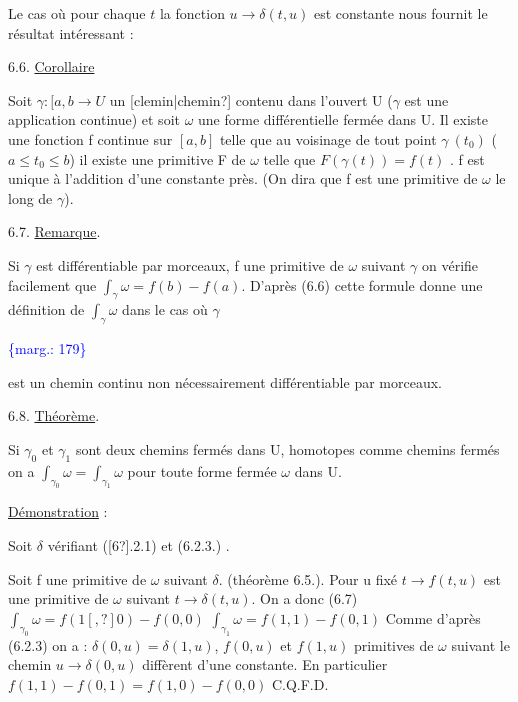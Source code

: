 \documentclass[11pt]{article}
\newcommand{\scanpage}[1]{\par\bigskip\noindent{\small\sffamily[scan #1]}\par}
\newcommand{\mspage}[1]{{\small\sffamily[p.\,#1]}}
\newcommand{\margin}[1]{\textcolor{blue}{\{\textsf{marg.:} #1\}}}
\newcommand{\uline}[1]{\underline{#1}}
\newcommand{\unsure}[1]{[#1?]}
\begin{document}
Le cas où pour chaque $t$ la fonction $u \to \delta(t,u)$ est constante nous
fournit le résultat intéressant :

6.6. \uline{Corollaire}

Soit $\gamma : [a,b \to U$ un \unsure{clemin|chemin} contenu dans l'ouvert U ($\gamma$ est une
application continue) et soit $\omega$ une forme différentielle fermée dans U. Il
existe une fonction f continue sur $[a,b]$ telle que au voisinage de tout
point $\gamma\ (t_0)$ ($a \leq t_0 \leq b$) il existe une primitive F de $\omega$ telle que
$F(\gamma(t)) = f(t)$ . f est unique à l'addition d'une constante près.
(On dira que f est une primitive de $\omega$ le long de $\gamma$).

6.7. \uline{Remarque}.

Si $\gamma$ est différentiable par morceaux, f une primitive de $\omega$
suivant $\gamma$ on vérifie facilement que $\int_\gamma \omega = f(b) - f(a)$.
D'après (6.6) cette formule donne une définition de $\int_\gamma \omega$ dans le cas où $\gamma$

\margin{179}

\clearpage
\scanpage{119/180}
\mspage{- 19 -}

est un chemin continu non nécessairement différentiable par morceaux.

6.8. \uline{Théorème}.

Si $\gamma_0$ et $\gamma_1$ sont deux chemins fermés dans U, homotopes comme
chemins fermés on a $\int_{\gamma_0} \omega = \int_{\gamma_1} \omega$ pour toute forme fermée $\omega$ dans U.

\uline{Démonstration} :

Soit $\delta$ vérifiant (\unsure{6}.2.1) et (6.2.3.) .

Soit f une primitive de $\omega$ suivant $\delta$. (théorème 6.5.). Pour u fixé
$t \to f(t,u)$ est une primitive de $\omega$ suivant $t \to \delta(t,u)$. On a donc (6.7)
$\int_{\gamma_0} \omega = f(1\unsure{,}0) - f(0,0)$
$\int_{\gamma_1} \omega = f(1,1) - f(0,1)$
Comme d'après (6.2.3) on a : $\delta(0,u) = \delta(1,u)$, $f(0,u)$ et $f(1,u)$ primitives
de $\omega$ suivant le chemin $u \to \delta(0,u)$ diffèrent d'une constante. En particulier
$f(1,1) - f(0,1) = f(1,0) - f(0,0)$ C.Q.F.D.
\end{document}
